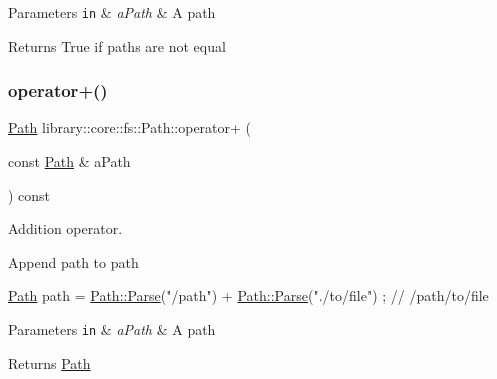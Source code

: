 \begin{DoxyParams}[1]{Parameters}
\mbox{\tt in}  & {\em a\+Path} & A path \\
\hline
\end{DoxyParams}
\begin{DoxyReturn}{Returns}
True if paths are not equal 
\end{DoxyReturn}
\mbox{\label{classlibrary_1_1core_1_1fs_1_1_path_a3f86a7054939a51f44b2f5a796470071}} 
\subsubsection{\texorpdfstring{operator+()}{operator+()}}
{\footnotesize\ttfamily \hyperlink{classlibrary_1_1core_1_1fs_1_1_path}{Path} library\+::core\+::fs\+::\+Path\+::operator+ (\begin{DoxyParamCaption}\item[{const \hyperlink{classlibrary_1_1core_1_1fs_1_1_path}{Path} \&}]{a\+Path }\end{DoxyParamCaption}) const}



Addition operator. 

Append path to path


\begin{DoxyCode}
\hyperlink{classlibrary_1_1core_1_1fs_1_1_path_aaba9a8e0153813f08f78f1c3275734a4}{Path} path = \hyperlink{classlibrary_1_1core_1_1fs_1_1_path_aebf5bd3af83e0b7376616e146f3e55df}{Path::Parse}(\textcolor{stringliteral}{"/path"}) + \hyperlink{classlibrary_1_1core_1_1fs_1_1_path_aebf5bd3af83e0b7376616e146f3e55df}{Path::Parse}(\textcolor{stringliteral}{"./to/file"}) ; \textcolor{comment}{// /path/to/file}
\end{DoxyCode}



\begin{DoxyParams}[1]{Parameters}
\mbox{\tt in}  & {\em a\+Path} & A path \\
\hline
\end{DoxyParams}
\begin{DoxyReturn}{Returns}
\hyperlink{classlibrary_1_1core_1_1fs_1_1_path}{Path} 
\end{DoxyReturn}
\mbox{\label{classlibrary_1_1core_1_1fs_1_1_path_a3fae713dbf257fdcec2fdb2ec6c27256}} 
